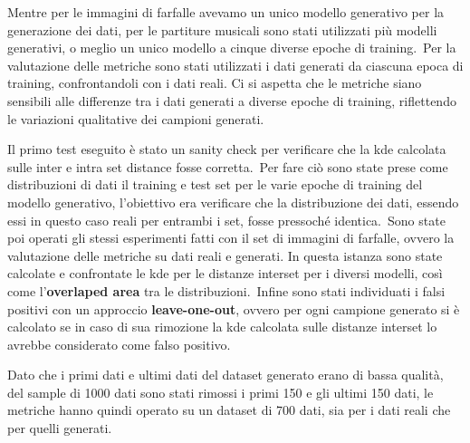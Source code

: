 Mentre per le immagini di farfalle avevamo un unico modello generativo per la generazione dei dati, per le partiture musicali sono stati utilizzati più modelli generativi, o meglio un unico modello a cinque diverse epoche di training.\
Per la valutazione delle metriche sono stati utilizzati i dati generati da ciascuna epoca di training, confrontandoli con i dati reali. Ci si aspetta che le metriche siano sensibili alle differenze tra i dati generati a diverse epoche di training, riflettendo le variazioni qualitative dei campioni generati.\

Il primo test eseguito è stato un sanity check per verificare che la kde calcolata sulle inter e intra set distance fosse corretta.\
Per fare ciò sono state prese come distribuzioni di dati il training e test set per le varie epoche di training del modello generativo, l'obiettivo era verificare che la distribuzione dei dati, essendo essi in questo caso reali per entrambi i set, fosse pressoché identica.\
Sono state poi operati gli stessi esperimenti fatti con il set di immagini di farfalle, ovvero la valutazione delle metriche su dati reali e generati. In questa istanza sono state calcolate e confrontate le kde per le distanze interset per i diversi modelli, così come l'\textbf{overlaped area} tra le distribuzioni.\
Infine sono stati individuati i falsi positivi con un approccio \textbf{leave-one-out}, ovvero per ogni campione generato si è calcolato se in caso di sua rimozione la kde calcolata sulle distanze interset lo avrebbe considerato come falso positivo.\

Dato che i primi dati e ultimi dati del dataset generato erano di bassa qualità, del sample di 1000 dati sono stati rimossi i primi 150 e gli ultimi 150 dati, le metriche hanno quindi operato su un dataset di 700 dati, sia per i dati reali che per quelli generati.\